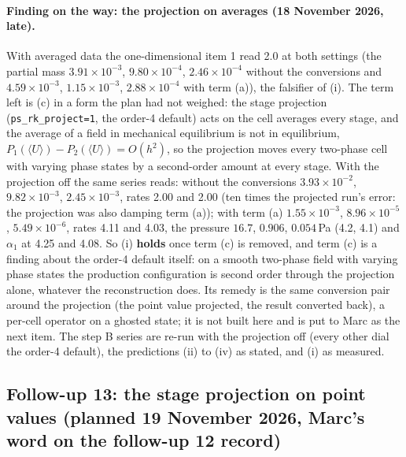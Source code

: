 \documentclass[11pt,a4paper]{article}
\newcommand{\code}[1]{\texttt{\small #1}}
\begin{document}
\paragraph{Finding on the way: the projection on averages (18 November 2026, late).}
With averaged data the one-dimensional item 1 read 2.0 at both settings
(the partial mass $3.91\times10^{-3}$, $9.80\times10^{-4}$,
$2.46\times10^{-4}$ without the conversions and $4.59\times10^{-3}$,
$1.15\times10^{-3}$, $2.88\times10^{-4}$ with term (a)), the falsifier of
(i).  The term left is (c) in a form the plan had not weighed: the stage
projection (\code{ps\_rk\_project=1}, the order-4 default) acts on the
cell averages every stage, and the average of a field in mechanical
equilibrium is not in equilibrium, $P_1(\langle U\rangle) -
P_2(\langle U\rangle) = O(h^2)$, so the projection moves every two-phase
cell with varying phase states by a second-order amount at every stage.
With the projection off the same series reads: without the conversions
$3.93\times10^{-2}$, $9.82\times10^{-3}$, $2.45\times10^{-3}$, rates 2.00
and 2.00 (ten times the projected run's error: the projection was also
damping term (a)); with term (a) $1.55\times10^{-3}$,
$8.96\times10^{-5}$, $5.49\times10^{-6}$, rates 4.11 and 4.03, the
pressure $16.7$, $0.906$, $0.054$\,Pa (4.2, 4.1) and $\alpha_1$ at 4.25
and 4.08.  So (i) \textbf{holds} once term (c) is removed, and term (c)
is a finding about the order-4 default itself: on a smooth two-phase
field with varying phase states the production configuration is second
order through the projection alone, whatever the reconstruction does.
Its remedy is the same conversion pair around the projection (the point
value projected, the result converted back), a per-cell operator on a
ghosted state; it is not built here and is put to Marc as the next
item.  The step B series are re-run with the projection off (every
other dial the order-4 default), the predictions (ii) to (iv) as stated,
and (i) as measured.

\subsection*{Follow-up 13: the stage projection on point values (planned 19 November 2026, Marc's word on the follow-up 12 record)}
\end{document}
